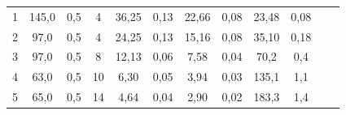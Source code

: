 \documentclass[a4paper, 12pt]{article}%
\begin{document}
\begin{enumerate}
\begin{table}[h!]
\begin{center}
\begin{tabular}{|c|c|c|c|c|c|c|c|c|c|c|c|}
1   & 145,0                                                     & 0,5                                                               & 4   & 36,25                                              & 0,13                                                       & 22,66                  & 0,08                         & 23,48                                               & 0,08                                                        &                                                    &                                                            \\ \cline{1-10}
2   & 97,0                                                      & 0,5                                                               & 4   & 24,25                                              & 0,13                                                       & 15,16                  & 0,08                         & 35,10                                               & 0,18                                                        &                                                    &                                                            \\ \cline{1-10}
3   & 97,0                                                      & 0,5                                                               & 8   & 12,13                                              & 0,06                                                       & 7,58                   & 0,04                         & 70,2                                                & 0,4                                                         &                                                    &                                                            \\ \cline{1-10}
4   & 63,0                                                      & 0,5                                                               & 10  & 6,30                                               & 0,05                                                       & 3,94                   & 0,03                         & 135,1                                               & 1,1                                                         &                                                    &                                                            \\ \cline{1-10}
5   & 65,0                                                      & 0,5                                                               & 14  & 4,64                                               & 0,04                                                       & 2,90                   & 0,02                         & 183,3                                               & 1,4                                                         &                                                    &                                                            \\ \cline{1-10}

\end{tabular}
\end{center}
\end{table}
\end{enumerate}
\end{document}
